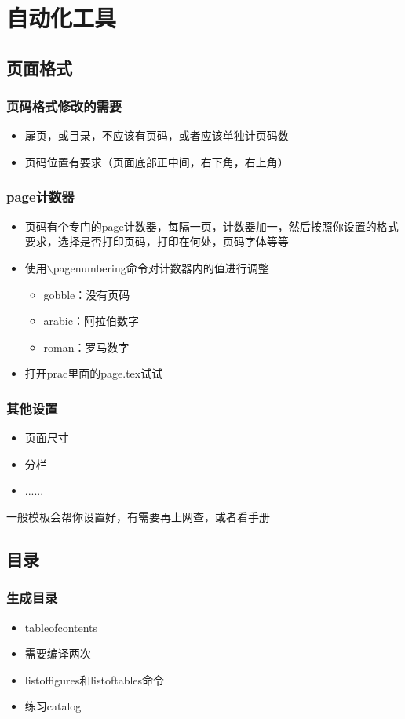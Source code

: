 \section{自动化工具}%

\subsection{页面格式}
    \begin{frame}
        \frametitle{页码格式修改的需要}
        \begin{itemize}
            \item 扉页，或目录，不应该有页码，或者应该单独计页码数
            \item 页码位置有要求（页面底部正中间，右下角，右上角）
        \end{itemize}
    \end{frame}
    
    \begin{frame}
        \frametitle{page计数器}
        \begin{itemize}
            \item 页码有个专门的page计数器，每隔一页，计数器加一，然后按照你设置的格式要求，选择是否打印页码，打印在何处，页码字体等等 \pause
            \item 使用$\backslash$pagenumbering命令对计数器内的值进行调整
                \begin{itemize}
                    \item gobble：没有页码
                    \item arabic：阿拉伯数字
                    \item roman：罗马数字
                \end{itemize}
            \item 打开prac里面的page.tex试试
        \end{itemize}
    \end{frame}

    \begin{frame}
        \frametitle{其他设置}
        \begin{itemize}
            \item 页面尺寸
            \item 分栏
            \item ......
        \end{itemize}
        一般模板会帮你设置好，有需要再上网查，或者看手册
    \end{frame}


\subsection{目录}
    \begin{frame}
        \frametitle{生成目录}
        \begin{itemize}
            \item tableofcontents
            \item 需要编译两次
            \item listoffigures和listoftables命令
            \item 练习catalog
        \end{itemize}
    \end{frame}

